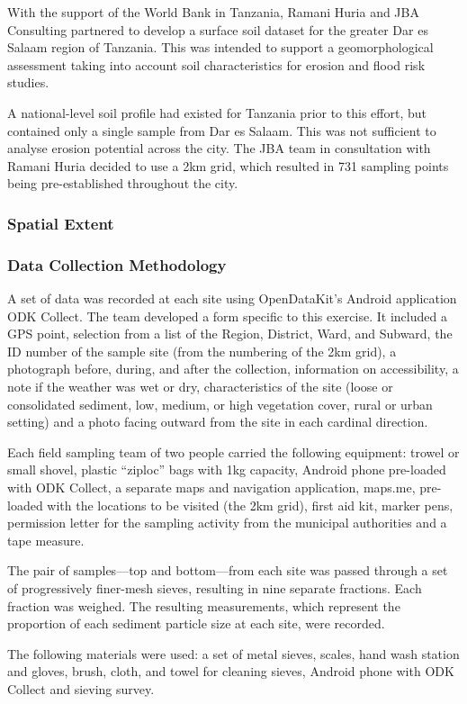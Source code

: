 \documentclass[a4paper,12pt,twoside]{article}
\begin{document}
With the support of the World Bank in Tanzania, Ramani Huria and JBA Consulting partnered to develop a surface soil dataset for the greater Dar es Salaam region of Tanzania. This was intended to support a geomorphological assessment taking into account soil characteristics for erosion and flood risk studies.

\medskip

A national-level soil profile had existed for Tanzania prior to this effort, but contained only a single sample from Dar es Salaam. This was not sufficient to analyse erosion potential across the city. The JBA team in consultation with Ramani Huria decided to use a 2km grid, which resulted in 731 sampling points being pre-established throughout the city.

\subsubsection{Spatial Extent}

\subsubsection{Data Collection Methodology}

\begin{multicols}{2}
A set of data was recorded at each site using OpenDataKit’s Android application ODK Collect. The team developed a form specific to this exercise. It included a GPS point, selection from a list of the Region, District, Ward, and Subward, the ID number of the sample site (from the numbering of the 2km 
grid), a photograph before, during, and after the collection, information on accessibility, a note if the weather was wet or dry, characteristics of the site (loose or consolidated sediment, low, medium, or high vegetation cover, rural or urban setting) and a photo facing outward from the site in each cardinal direction.

Each field sampling team of two people carried the following equipment: trowel or small shovel, plastic “ziploc” bags with 1kg capacity, Android phone pre-loaded with ODK Collect, a separate maps and navigation application, maps.me, pre-loaded with the locations to be visited (the 2km grid), first aid kit, marker pens, permission letter for the sampling activity from the municipal authorities and a tape measure.

The pair of samples—top and bottom—from each site was passed through a set of progressively finer-mesh sieves, resulting in nine separate fractions. Each fraction was weighed. The resulting measurements, which represent the proportion of each sediment particle size at each site, were
recorded.

The following materials were used: a set of metal sieves, scales, hand wash station and gloves, brush, cloth, and towel for cleaning sieves, Android phone with ODK Collect and sieving survey.
\end{multicols}
\end{document}
